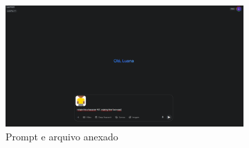 

\begin{figure}[htbp]
    \centering
    \caption{\small Processo da geração 1 do sprite em side view no Gemini Pro em julho/2025}
    \label{fig:geminiPro1}

    \begin{subfigure}{1\linewidth}
        \includegraphics[width=1\linewidth]{figs/geminiPro/chat1/tela1.PNG}
        \caption{\small Prompt e arquivo anexado}
        \label{fig:geminiPro1Prompt}
    \end{subfigure}
    \begin{subfigure}{0.22\linewidth}

\end{subfigure}
\end{figure}
